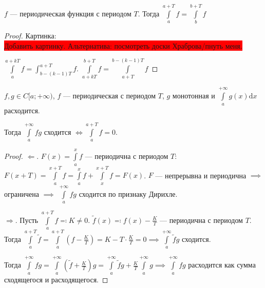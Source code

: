 \begin{statement}
    $f$ --- периодическая функция с периодом  $T$. Тогда  $\int\limits_a^{a+T} f = \int\limits_b^{b+T}f$ 
\end{statement}
\begin{proof}
    Картинка:\\
    \colorbox{red}{Добавить картинку. Альтернатива: посмотреть доски Храброва/пнуть меня.}
    
    $\int\limits_a^{a+kT}f = \int_{b-(k-1)T}^{a+T}f$.  $\int\limits_{a+kT}^{b+T} f = \int\limits_{a+T}^{b-(k-1)T} f$
\end{proof}
\begin{consequence}
   $f, g\in C[a;+\infty)$,  $f$ --- периодическая с периодом  $T$,  $g$ монотонная и  $\int\limits_a^{+\infty} g(x) \mathrm{d}x$ расходится. 

   Тогда $\int\limits_a^{+\infty} fg$ сходится  $\iff \int\limits_a^{a+T} f = 0$.
\end{consequence}
\begin{proof}
    $\Leftarrow$.  $F(x) = \int\limits_a^x f$ --- периодична с периодом  $T$:  $F(x+T) = \int\limits_a^{x+T} f = \int\limits_a^x f + \int\limits_x^{x+T}f = F(x)$.  $F$ --- непрерывна и периодична  $\implies$ ограничена  $\implies$  $\int\limits_a^{+\infty} fg$ сходится по признаку Дирихле.

    $\Rightarrow$. Пусть  $\int\limits_a^{a+T} f \eqqcolon K \neq 0$.  $\widetilde{f}(x) \eqqcolon f(x) - \frac{K}{T}$ --- периодична с периодом $T$. Тогда  $\int\limits_a^{a+T} \widetilde{f} = \int\limits_a^{a+T}(f-\frac{K}{T}) = K - T \cdot \frac{K}{T} = 0 \implies \int\limits_a^{+\infty} \widetilde{f}g$ сходится.

    Тогда $\int\limits_a^{+\infty} fg = \int\limits_a^{+\infty}(\widetilde{f} + \frac{K}{T})g = \int\limits_a^{+\infty} \widetilde{f}g + \frac{K}{T}\int\limits_a^{+\infty} g \implies \int\limits_a^{+\infty} fg$ расходится как сумма сходящегося и расходящегося. 
\end{proof}
